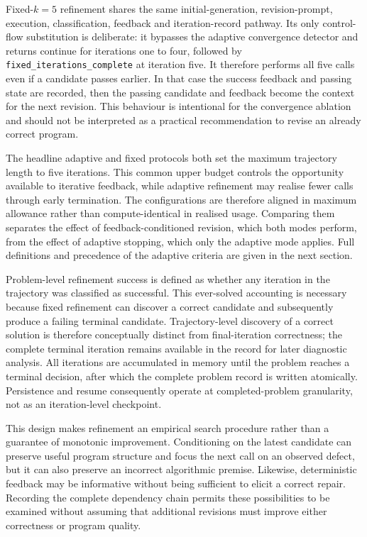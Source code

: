 Fixed-$k=5$ refinement shares the same initial-generation, revision-prompt, execution, classification, feedback and iteration-record pathway. Its only control-flow substitution is deliberate: it bypasses the adaptive convergence detector and returns continue for iterations one to four, followed by \texttt{fixed\_iterations\_complete} at iteration five. It therefore performs all five calls even if a candidate passes earlier. In that case the success feedback and passing state are recorded, then the passing candidate and feedback become the context for the next revision. This behaviour is intentional for the convergence ablation and should not be interpreted as a practical recommendation to revise an already correct program.

The headline adaptive and fixed protocols both set the maximum trajectory length to five iterations. This common upper budget controls the opportunity available to iterative feedback, while adaptive refinement may realise fewer calls through early termination. The configurations are therefore aligned in maximum allowance rather than compute-identical in realised usage. Comparing them separates the effect of feedback-conditioned revision, which both modes perform, from the effect of adaptive stopping, which only the adaptive mode applies. Full definitions and precedence of the adaptive criteria are given in the next section.

Problem-level refinement success is defined as whether any iteration in the trajectory was classified as successful. This ever-solved accounting is necessary because fixed refinement can discover a correct candidate and subsequently produce a failing terminal candidate. Trajectory-level discovery of a correct solution is therefore conceptually distinct from final-iteration correctness; the complete terminal iteration remains available in the record for later diagnostic analysis. All iterations are accumulated in memory until the problem reaches a terminal decision, after which the complete problem record is written atomically. Persistence and resume consequently operate at completed-problem granularity, not as an iteration-level checkpoint.

This design makes refinement an empirical search procedure rather than a guarantee of monotonic improvement. Conditioning on the latest candidate can preserve useful program structure and focus the next call on an observed defect, but it can also preserve an incorrect algorithmic premise. Likewise, deterministic feedback may be informative without being sufficient to elicit a correct repair. Recording the complete dependency chain permits these possibilities to be examined without assuming that additional revisions must improve either correctness or program quality.

